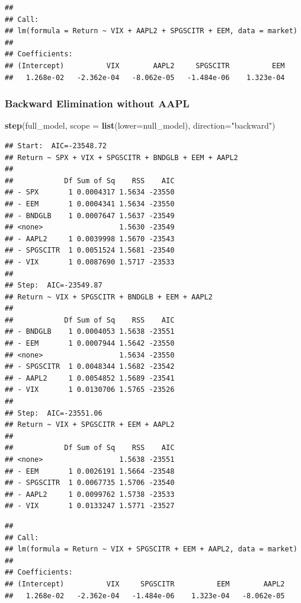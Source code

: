 \documentclass[]{article}
\newenvironment{Shaded}{\begin{snugshade}}{\end{snugshade}}
\newcommand{\KeywordTok}[1]{\textcolor[rgb]{0.13,0.29,0.53}{\textbf{#1}}}
\newcommand{\DataTypeTok}[1]{\textcolor[rgb]{0.13,0.29,0.53}{#1}}
\newcommand{\StringTok}[1]{\textcolor[rgb]{0.31,0.60,0.02}{#1}}
\newcommand{\NormalTok}[1]{#1}
\begin{document}
\begin{verbatim}
## 
## Call:
## lm(formula = Return ~ VIX + AAPL2 + SPGSCITR + EEM, data = market)
## 
## Coefficients:
## (Intercept)          VIX        AAPL2     SPGSCITR          EEM  
##   1.268e-02   -2.362e-04   -8.062e-05   -1.484e-06    1.323e-04
\end{verbatim}

\subsubsection{Backward Elimination without
AAPL}\label{backward-elimination-without-aapl}

\begin{Shaded}
\begin{Highlighting}[]
\KeywordTok{step}\NormalTok{(full_model, }\DataTypeTok{scope =} \KeywordTok{list}\NormalTok{(}\DataTypeTok{lower=}\NormalTok{null_model), }\DataTypeTok{direction=}\StringTok{"backward"}\NormalTok{)}
\end{Highlighting}
\end{Shaded}

\begin{verbatim}
## Start:  AIC=-23548.72
## Return ~ SPX + VIX + SPGSCITR + BNDGLB + EEM + AAPL2
## 
##            Df Sum of Sq    RSS    AIC
## - SPX       1 0.0004317 1.5634 -23550
## - EEM       1 0.0004341 1.5634 -23550
## - BNDGLB    1 0.0007647 1.5637 -23549
## <none>                  1.5630 -23549
## - AAPL2     1 0.0039998 1.5670 -23543
## - SPGSCITR  1 0.0051524 1.5681 -23540
## - VIX       1 0.0087690 1.5717 -23533
## 
## Step:  AIC=-23549.87
## Return ~ VIX + SPGSCITR + BNDGLB + EEM + AAPL2
## 
##            Df Sum of Sq    RSS    AIC
## - BNDGLB    1 0.0004053 1.5638 -23551
## - EEM       1 0.0007944 1.5642 -23550
## <none>                  1.5634 -23550
## - SPGSCITR  1 0.0048344 1.5682 -23542
## - AAPL2     1 0.0054852 1.5689 -23541
## - VIX       1 0.0130706 1.5765 -23526
## 
## Step:  AIC=-23551.06
## Return ~ VIX + SPGSCITR + EEM + AAPL2
## 
##            Df Sum of Sq    RSS    AIC
## <none>                  1.5638 -23551
## - EEM       1 0.0026191 1.5664 -23548
## - SPGSCITR  1 0.0067735 1.5706 -23540
## - AAPL2     1 0.0099762 1.5738 -23533
## - VIX       1 0.0133247 1.5771 -23527
\end{verbatim}

\begin{verbatim}
## 
## Call:
## lm(formula = Return ~ VIX + SPGSCITR + EEM + AAPL2, data = market)
## 
## Coefficients:
## (Intercept)          VIX     SPGSCITR          EEM        AAPL2  
##   1.268e-02   -2.362e-04   -1.484e-06    1.323e-04   -8.062e-05
\end{verbatim}
\end{document}

